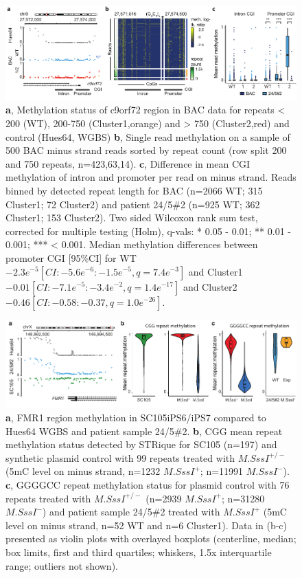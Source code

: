 \begin{figure}[h]
    \centering
    \includegraphics[width=1.0\textwidth]{figures/strique/methylation_bac_region.pdf}
    \captionsetup{format=plain}
    \caption[Nanopore single read methylation in BAC data]{\textbf{a}, Methylation status of c9orf72 region in BAC data for repeats < 200 (WT), 200-750 (Cluster1,orange) and > 750 (Cluster2,red) and control (Hues64, WGBS) \textbf{b}, Single read methylation on a sample of 500 BAC minus strand reads sorted by repeat count (row split 200 and 750 repeats, n=423,63,14). \textbf{c}, Difference in mean CGI methylation of intron and promoter per read on minus strand. Reads binned by detected repeat length for BAC (n=2066 WT; 315 Cluster1; 72 Cluster2) and patient 24/5\#2 (n=925 WT; 362 Cluster1; 153 Cluster2). Two sided Wilcoxon rank sum test, corrected for multiple testing (Holm), q-vals: * 0.05 - 0.01; ** 0.01 - 0.001; *** < 0.001. Median methylation differences between promoter CGI [95\%CI] for WT $-2.3e^{-5} [CI: -5.6e^{-6}:-1.5e^{-5}, q=7.4e^{-3}] $ and Cluster1 $ -0.01 [CI: -7.1e^{-5}:-3.4e^{-2}, q=1.4e^{-17}] $ and Cluster2 $ -0.46 [CI: -0.58:-0.37, q=1.0e^{-26}] $.}
    \label{fig:strique:methylation_bac_region}
\end{figure}

\begin{figure}[h]
    \centering
    \includegraphics[width=1.0\textwidth]{figures/strique/methylation_repeat.pdf}
    \captionsetup{format=plain}
    \caption[Region and repeat methylation detection]{\textbf{a}, FMR1 region methylation in SC105iPS6/iPS7 compared to Hues64 WGBS and patient sample 24/5\#2. \textbf{b}, CGG mean repeat methylation status detected by STRique for SC105 (n=197) and synthetic plasmid control with 99 repeats treated with $ M.SssI^{+/-} $ (5mC level on minus strand, n=1232 $ M.SssI^{+} $; n=11991 $ M.SssI^{-} $). \textbf{c}, GGGGCC repeat methylation status for plasmid control with 76 repeats treated with $ M.SssI^{+/-} $ (n=2939 $ M.SssI^{+} $; n=31280 $ M.SssI^{-} $) and patient sample 24/5\#2 treated with $ M.SssI^{+} $ (5mC level on minus strand, n=52 WT and n=6 Cluster1). Data in (b-c) presented as violin plots with overlayed boxplots (centerline, median; box limits, first and third quartiles; whiskers, 1.5x interquartile range; outliers not shown).}
    \label{fig:strique:methylation_repeat}
\end{figure}




